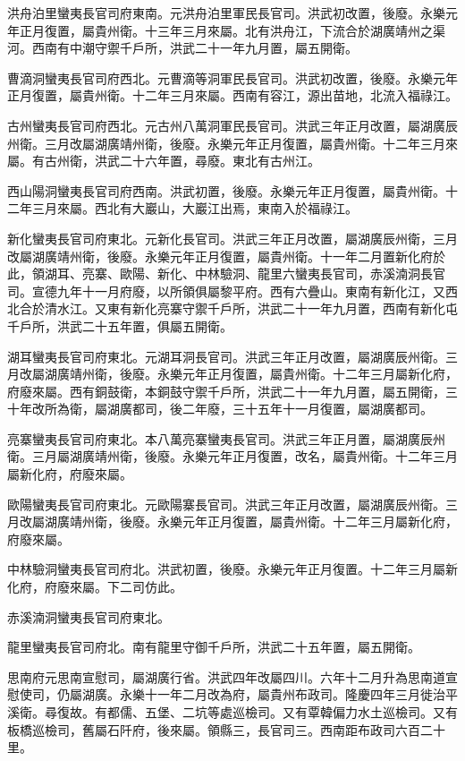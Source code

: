 洪舟泊里蠻夷長官司府東南。元洪舟泊里軍民長官司。洪武初改置，後廢。永樂元年正月復置，屬貴州衛。十三年三月來屬。北有洪舟江，下流合於湖廣靖州之渠河。西南有中潮守禦千戶所，洪武二十一年九月置，屬五開衛。

曹滴洞蠻夷長官司府西北。元曹滴等洞軍民長官司。洪武初改置，後廢。永樂元年正月復置，屬貴州衛。十二年三月來屬。西南有容江，源出苗地，北流入福祿江。

古州蠻夷長官司府西北。元古州八萬洞軍民長官司。洪武三年正月改置，屬湖廣辰州衛。三月改屬湖廣靖州衛，後廢。永樂元年正月復置，屬貴州衛。十二年三月來屬。有古州衛，洪武二十六年置，尋廢。東北有古州江。

西山陽洞蠻夷長官司府西南。洪武初置，後廢。永樂元年正月復置，屬貴州衛。十二年三月來屬。西北有大巖山，大巖江出焉，東南入於福祿江。

新化蠻夷長官司府東北。元新化長官司。洪武三年正月改置，屬湖廣辰州衛，三月改屬湖廣靖州衛，後廢。永樂元年正月復置，屬貴州衛。十一年二月置新化府於此，領湖耳、亮寨、歐陽、新化、中林驗洞、龍里六蠻夷長官司，赤溪湳洞長官司。宣德九年十一月府廢，以所領俱屬黎平府。西有六疊山。東南有新化江，又西北合於清水江。又東有新化亮寨守禦千戶所，洪武二十一年九月置，西南有新化屯千戶所，洪武二十五年置，俱屬五開衛。

湖耳蠻夷長官司府東北。元湖耳洞長官司。洪武三年正月改置，屬湖廣辰州衛。三月改屬湖廣靖州衛，後廢。永樂元年正月復置，屬貴州衛。十二年三月屬新化府，府廢來屬。西有銅鼓衛，本銅鼓守禦千戶所，洪武二十一年九月置，屬五開衛，三十年改所為衛，屬湖廣都司，後二年廢，三十五年十一月復置，屬湖廣都司。

亮寨蠻夷長官司府東北。本八萬亮寨蠻夷長官司。洪武三年正月置，屬湖廣辰州衛。三月屬湖廣靖州衛，後廢。永樂元年正月復置，改名，屬貴州衛。十二年三月屬新化府，府廢來屬。

歐陽蠻夷長官司府東北。元歐陽寨長官司。洪武三年正月改置，屬湖廣辰州衛。三月改屬湖廣靖州衛，後廢。永樂元年正月復置，屬貴州衛。十二年三月屬新化府，府廢來屬。

中林驗洞蠻夷長官司府北。洪武初置，後廢。永樂元年正月復置。十二年三月屬新化府，府廢來屬。下二司仿此。

赤溪湳洞蠻夷長官司府東北。

龍里蠻夷長官司府北。南有龍里守御千戶所，洪武二十五年置，屬五開衛。

思南府元思南宣慰司，屬湖廣行省。洪武四年改屬四川。六年十二月升為思南道宣慰使司，仍屬湖廣。永樂十一年二月改為府，屬貴州布政司。隆慶四年三月徙治平溪衛。尋復故。有都儒、五堡、二坑等處巡檢司。又有覃韓偏力水土巡檢司。又有板橋巡檢司，舊屬石阡府，後來屬。領縣三，長官司三。西南距布政司六百二十里。

